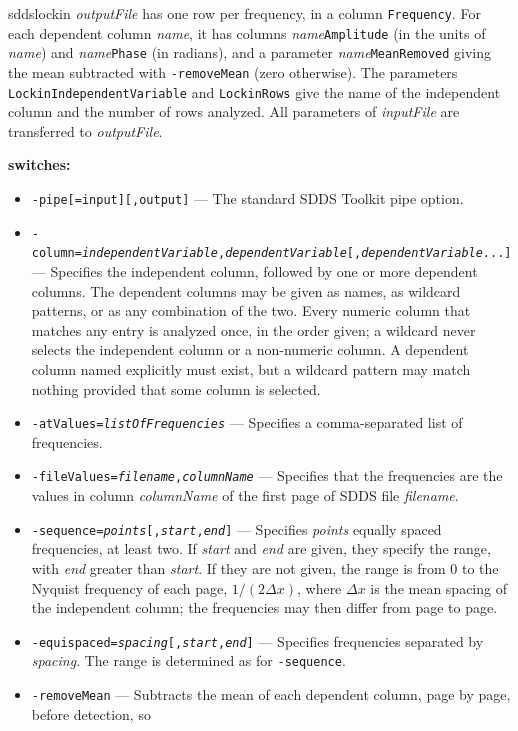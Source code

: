 \begin{sddsprog}{sddslockin}
  \emph{outputFile} has one row per frequency, in a column {\tt Frequency}.  For each dependent column
  \emph{name}, it has columns \emph{name}{\tt Amplitude} (in the units of \emph{name}) and \emph{name}{\tt Phase}
  (in radians), and a parameter \emph{name}{\tt MeanRemoved} giving the mean subtracted with \verb|-removeMean| (zero
  otherwise).  The parameters {\tt LockinIndependentVariable} and {\tt LockinRows} give the name of the independent
  column and the number of rows analyzed.  All parameters of \emph{inputFile} are transferred to \emph{outputFile}.
  \item \textbf{switches:}
    \begin{itemize}
      \item \verb|-pipe[=input][,output]| --- The standard SDDS Toolkit pipe option.
      \item {\tt -column={\em independentVariable},{\em dependentVariable}[,{\em dependentVariable}...]} --- Specifies
      the independent column, followed by one or more dependent columns.  The dependent columns may be given as names,
      as wildcard patterns, or as any combination of the two.  Every numeric column that matches any entry is analyzed
      once, in the order given; a wildcard never selects the independent column or a non-numeric column.  A
      dependent column named explicitly must exist, but a wildcard pattern may match nothing provided that some
      column is selected.
      \item {\tt -atValues={\em listOfFrequencies}} --- Specifies a comma-separated list of frequencies.
      \item {\tt -fileValues={\em filename},{\em columnName}} --- Specifies that the frequencies are the values in
      column {\em columnName} of the first page of SDDS file {\em filename}.
      \item {\tt -sequence={\em points}[,{\em start},{\em end}]} --- Specifies {\em points} equally spaced
      frequencies, at least two.  If {\em start} and {\em end} are given, they specify the range, with {\em end}
      greater than {\em start}.  If they are not given, the range is from 0 to the Nyquist frequency of each page,
      $1/(2\Delta x)$, where $\Delta x$ is the mean spacing of the independent column; the frequencies may then differ
      from page to page.
      \item {\tt -equispaced={\em spacing}[,{\em start},{\em end}]} --- Specifies frequencies separated by
      {\em spacing}.  The range is determined as for \verb|-sequence|.
      \item \verb|-removeMean| --- Subtracts the mean of each dependent column, page by page, before detection, so

\end{itemize}
\end{sddsprog}
